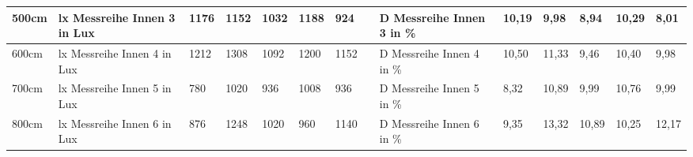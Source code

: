 \begin{table}[H]
{\begin{tabular}{|l|l|l|l|l|l|l|l|l|l|l|l|l|l|}
    \rowcolor[HTML]{C6E0B4} 
    500cm                                             & lx   Messreihe Innen 3 in Lux                                   & 1176                              & 1152                              & 1032                              & 1188                              & 924                               & \cellcolor[HTML]{A9D08E}{\color[HTML]{000000} 11540}          & D   Messreihe Innen 3 in \%                                     & 10,19                                     & 9,98                                       & 8,94                                       & 10,29                                      & 8,01                                       \\ \hline
    \rowcolor[HTML]{E2EFDA} 
    600cm                                             & lx   Messreihe Innen 4 in Lux                                   & 1212                              & 1308                              & 1092                              & 1200                              & 1152                              & \cellcolor[HTML]{A9D08E}{\color[HTML]{000000} 11540}          & D   Messreihe Innen 4 in \%                                     & 10,50                                     & 11,33                                      & 9,46                                       & 10,40                                      & 9,98                                       \\ \hline
    \rowcolor[HTML]{C6E0B4} 
    700cm                                             & lx  Messreihe Innen 5 in Lux                                    & 780                               & 1020                              & 936                               & 1008                              & 936                               & \cellcolor[HTML]{A9D08E}{\color[HTML]{000000} 9370}           & D  Messreihe Innen 5 in \%                                      & 8,32                                      & 10,89                                      & 9,99                                       & 10,76                                      & 9,99                                       \\ \hline
    \rowcolor[HTML]{E2EFDA} 
    800cm                                             & lx   Messreihe Innen 6 in Lux                                   & 876                               & 1248                              & 1020                              & 960                               & 1140                              & \cellcolor[HTML]{A9D08E}{\color[HTML]{000000} 9370}           & D   Messreihe Innen 6 in \%                                     & 9,35                                      & 13,32                                      & 10,89                                      & 10,25                                      & 12,17                                      \\ \hline
    \end{tabular}%
    }
    \end{table}
